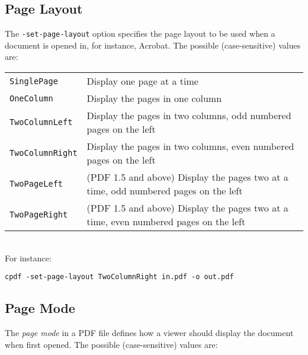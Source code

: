\documentclass{book}
\begin{document}
  \subsection{Page Layout}
  The \texttt{-set-page-layout} option specifies the page layout to be used
when a document is opened in, for instance, Acrobat. The possible
(case-sensitive) values are:

\vspace{2mm}
  {\small\begin{tabular}{ll}
    \texttt{SinglePage} & \vspace{2mm} \parbox{8cm}{Display one page at a time} \\
    \texttt{OneColumn} & \vspace{2mm} \parbox{8cm}{Display the pages in one column} \\
    \texttt{TwoColumnLeft} & \vspace{2mm} \parbox{8cm}{Display the pages in two columns, odd numbered pages on the left} \\
    \texttt{TwoColumnRight} & \vspace{2mm} \parbox{8cm}{Display the pages in two columns, even numbered pages on the left} \\
    \texttt{TwoPageLeft} & \vspace{2mm} \parbox{8cm}{(PDF 1.5 and above) Display the pages two at a time, odd numbered pages on the left} \\
    \texttt{TwoPageRight} & \vspace{2mm} \parbox{8cm}{(PDF 1.5 and above) Display the pages two at a time, even numbered pages on the left}
  \end{tabular}}\\

  \noindent For instance:
  \begin{framed}
    \small\verb!cpdf -set-page-layout TwoColumnRight in.pdf -o out.pdf!
  \end{framed}
  
  \subsection{Page Mode}
  The \textit{page mode} in a PDF file defines how a viewer should display the
document when first opened. The possible (case-sensitive) values are:
\end{document}
